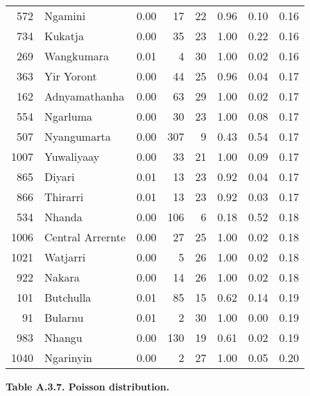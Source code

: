 \begin{longtable}[]{@{}rlrrrrrr@{}}
572 & Ngamini & 0.00 & 17 & 22 & 0.96 & 0.10 & 0.16\tabularnewline
734 & Kukatja & 0.00 & 35 & 23 & 1.00 & 0.22 & 0.16\tabularnewline
269 & Wangkumara & 0.01 & 4 & 30 & 1.00 & 0.02 & 0.16\tabularnewline
363 & Yir Yoront & 0.00 & 44 & 25 & 0.96 & 0.04 & 0.17\tabularnewline
162 & Adnyamathanha & 0.00 & 63 & 29 & 1.00 & 0.02 & 0.17\tabularnewline
554 & Ngarluma & 0.00 & 30 & 23 & 1.00 & 0.08 & 0.17\tabularnewline
507 & Nyangumarta & 0.00 & 307 & 9 & 0.43 & 0.54 & 0.17\tabularnewline
1007 & Yuwaliyaay & 0.00 & 33 & 21 & 1.00 & 0.09 & 0.17\tabularnewline
865 & Diyari & 0.01 & 13 & 23 & 0.92 & 0.04 & 0.17\tabularnewline
866 & Thirarri & 0.01 & 13 & 23 & 0.92 & 0.03 & 0.17\tabularnewline
534 & Nhanda & 0.00 & 106 & 6 & 0.18 & 0.52 & 0.18\tabularnewline
1006 & Central Arrernte & 0.00 & 27 & 25 & 1.00 & 0.02 &
0.18\tabularnewline
1021 & Watjarri & 0.00 & 5 & 26 & 1.00 & 0.02 & 0.18\tabularnewline
922 & Nakara & 0.00 & 14 & 26 & 1.00 & 0.02 & 0.18\tabularnewline
101 & Butchulla & 0.01 & 85 & 15 & 0.62 & 0.14 & 0.19\tabularnewline
91 & Bularnu & 0.01 & 2 & 30 & 1.00 & 0.00 & 0.19\tabularnewline
983 & Nhangu & 0.00 & 130 & 19 & 0.61 & 0.02 & 0.19\tabularnewline
1040 & Ngarinyin & 0.00 & 2 & 27 & 1.00 & 0.05 & 0.20\tabularnewline
\bottomrule
\end{longtable}

\newpage

\textbf{Table A.3.7. Poisson distribution.}

